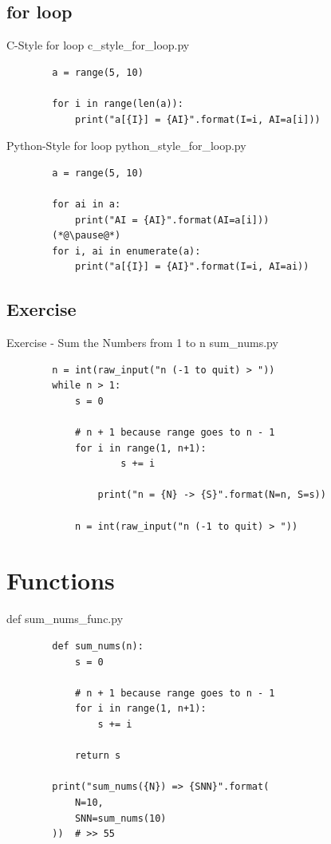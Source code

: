 \documentclass[11pt]{beamer}
\begin{document}
\subsection{for loop}
\begin{frame}[fragile]{C-Style for loop}
	c\_style\_for\_loop.py
	\begin{lstlisting}
		a = range(5, 10)
		
		for i in range(len(a)):
		    print("a[{I}] = {AI}".format(I=i, AI=a[i]))
	\end{lstlisting}
\end{frame}

\begin{frame}[fragile]{Python-Style for loop}
	python\_style\_for\_loop.py
	\begin{lstlisting}
		a = range(5, 10)
		
		for ai in a:
		    print("AI = {AI}".format(AI=a[i])) 
		(*@\pause@*)
		for i, ai in enumerate(a):
		    print("a[{I}] = {AI}".format(I=i, AI=ai))
	\end{lstlisting}
\end{frame}

\subsection{Exercise}
\begin{frame}[fragile]{Exercise - Sum the Numbers from 1 to n}
	sum\_nums.py	
	\pause
	\begin{lstlisting}
		n = int(raw_input("n (-1 to quit) > "))
		while n > 1:
		    s = 0		 
		    
		    # n + 1 because range goes to n - 1   
		    for i in range(1, n+1):
		    	    s += i
		    	
		    	print("n = {N} -> {S}".format(N=n, S=s))
		    
		    n = int(raw_input("n (-1 to quit) > "))
	\end{lstlisting}
\end{frame}

\section{Functions}
\begin{frame}[fragile]{def}
	sum\_nums\_func.py
	\begin{lstlisting}
		def sum_nums(n):
		    s = 0
		    
		    # n + 1 because range goes to n - 1
		    for i in range(1, n+1):
		        s += i
			
		    return s
		
		print("sum_nums({N}) => {SNN}".format(
		    N=10, 
		    SNN=sum_nums(10)
		))  # >> 55
	\end{lstlisting}
\end{frame}
\end{document}

